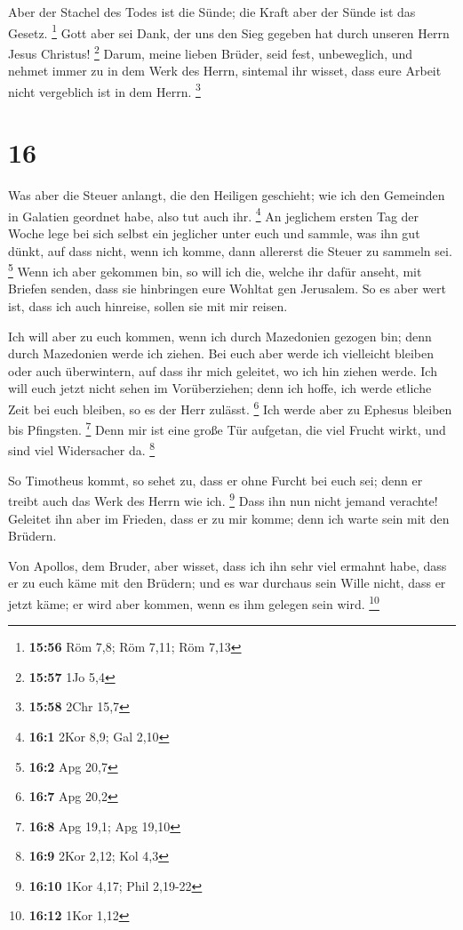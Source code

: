  Aber der Stachel des Todes ist die Sünde; die Kraft aber
der Sünde ist das Gesetz. \footnote{\textbf{15:56} Röm 7,8; Röm 7,11;
  Röm 7,13}  Gott aber sei Dank, der uns den Sieg gegeben
hat durch unseren Herrn Jesus Christus! \footnote{\textbf{15:57} 1Jo 5,4}
 Darum, meine lieben Brüder, seid fest, unbeweglich, und
nehmet immer zu in dem Werk des Herrn, sintemal ihr wisset, dass eure
Arbeit nicht vergeblich ist in dem Herrn. \footnote{\textbf{15:58} 2Chr
  15,7}

\hypertarget{section-10}{%
\section{16}\label{section-10}}

 Was aber die Steuer anlangt, die den Heiligen geschieht;
wie ich den Gemeinden in Galatien geordnet habe, also tut auch ihr.
\footnote{\textbf{16:1} 2Kor 8,9; Gal 2,10}  An jeglichem
ersten Tag der Woche lege bei sich selbst ein jeglicher unter euch und
sammle, was ihn gut dünkt, auf dass nicht, wenn ich komme, dann
allererst die Steuer zu sammeln sei. \footnote{\textbf{16:2} Apg 20,7}
 Wenn ich aber gekommen bin, so will ich die, welche ihr
dafür anseht, mit Briefen senden, dass sie hinbringen eure Wohltat gen
Jerusalem.  So es aber wert ist, dass ich auch hinreise,
sollen sie mit mir reisen.

 Ich will aber zu euch kommen, wenn ich durch Mazedonien
gezogen bin; denn durch Mazedonien werde ich ziehen.  Bei
euch aber werde ich vielleicht bleiben oder auch überwintern, auf dass
ihr mich geleitet, wo ich hin ziehen werde.  Ich will euch
jetzt nicht sehen im Vorüberziehen; denn ich hoffe, ich werde etliche
Zeit bei euch bleiben, so es der Herr zulässt. \footnote{\textbf{16:7}
  Apg 20,2}  Ich werde aber zu Ephesus bleiben bis
Pfingsten. \footnote{\textbf{16:8} Apg 19,1; Apg 19,10} 
Denn mir ist eine große Tür aufgetan, die viel Frucht wirkt, und sind
viel Widersacher da. \footnote{\textbf{16:9} 2Kor 2,12; Kol 4,3}

 So Timotheus kommt, so sehet zu, dass er ohne Furcht bei
euch sei; denn er treibt auch das Werk des Herrn wie ich. \footnote{\textbf{16:10}
  1Kor 4,17; Phil 2,19-22}  Dass ihn nun nicht jemand
verachte! Geleitet ihn aber im Frieden, dass er zu mir komme; denn ich
warte sein mit den Brüdern.

 Von Apollos, dem Bruder, aber wisset, dass ich ihn sehr
viel ermahnt habe, dass er zu euch käme mit den Brüdern; und es war
durchaus sein Wille nicht, dass er jetzt käme; er wird aber kommen, wenn
es ihm gelegen sein wird. \footnote{\textbf{16:12} 1Kor 1,12}

